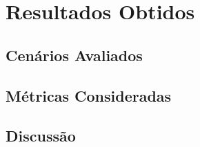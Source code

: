 \chapter{Resultados Obtidos}
\label{cap:resultados}

\section{Cenários Avaliados}

\section{Métricas Consideradas}

\section{Discussão}

